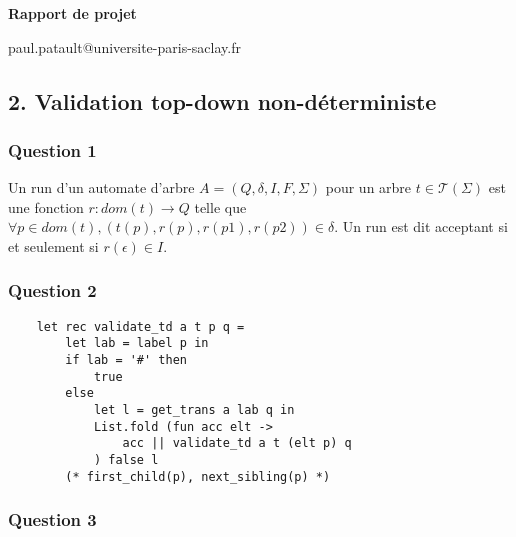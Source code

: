 \documentclass[a4paper,12pt]{article}
\begin{document}

\setlength{\headheight}{13.59999pt}
\addtolength{\topmargin}{-1.59999pt}


\begin{center}

  \textbf{\Large Rapport de projet}


  {\ttfamily paul.patault@universite-paris-saclay.fr} \\


\end{center}


\subsection*{2. Validation top-down non-déterministe}
\subsubsection*{Question 1}

Un run d'un automate d'arbre $A = (Q, \delta, I, F, \Sigma)$
pour un arbre $t \in {\mathcal{T}}(\Sigma)$
est une fonction $r : dom(t) \to Q$
telle que $\forall p \in dom(t), (t(p), r(p), r(p1),r(p2)) \in \delta$.
Un run est dit acceptant si et seulement si $r (\epsilon) \in I$.

\subsubsection*{Question 2}

  \begin{verbatim}
    let rec validate_td a t p q =
        let lab = label p in
        if lab = '#' then
            true
        else
            let l = get_trans a lab q in
            List.fold (fun acc elt ->
                acc || validate_td a t (elt p) q
            ) false l
        (* first_child(p), next_sibling(p) *)
   \end{verbatim}

\subsubsection*{Question 3}
\end{document}
